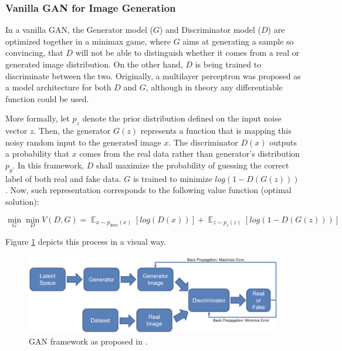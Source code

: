 \documentclass[
]{krantz}
\begin{document}
\hypertarget{vanilla-gan-for-image-generation}{%
\subsubsection{Vanilla GAN for Image Generation}\label{vanilla-gan-for-image-generation}}

In a vanilla GAN, the Generator model (\(G\)) and Discriminator model (\(D\)) are optimized together in a minimax game, where \(G\) aims at generating a sample so convincing, that \(D\) will not be able to distinguish whether it comes from a real or generated image distribution. On the other hand, \(D\) is being trained to discriminate between the two. Originally, a multilayer perceptron was proposed as a model architecture for both \(D\) and \(G\), although in theory any differentiable function could be used.

More formally, let \(p_{z}\) denote the prior distribution defined on the input noise vector \(z\). Then, the generator \(G(z)\) represents a function that is mapping this noisy random input to the generated image \(x\). The discriminator \(D(x)\) outputs a probability that \(x\) comes from the real data rather than generator's distribution \(p_{g}\). In this framework, \(D\) shall maximize the probability of guessing the correct label of both real and fake data. \(G\) is trained to minimize \(log(1-D(G(z)))\). Now, such representation corresponds to the following value function (optimal solution):

\[\min_{G}\min_{D}V(D,G) = \mathop{{}\mathbb{E}}_{x \sim p_{data}(x)} [log(D(x))] + \mathop{{}\mathbb{E}}_{z \sim p_{z}(z)} [log(1-D(G(z)))]\]

Figure \ref{fig:vanillagan} depicts this process in a visual way.

\begin{figure}

{\centering \includegraphics[width=0.8\linewidth]{figures/02-02-text-2-img/vanillagan} 

}

\caption{GAN framework as proposed in \citet{GAN2014}.}\label{fig:vanillagan}
\end{figure}
\end{document}
